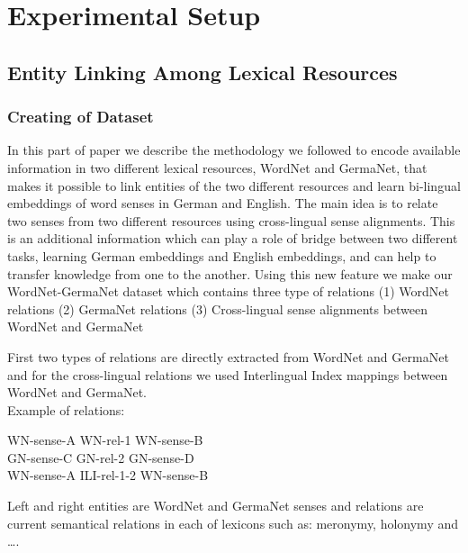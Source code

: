 \chapter{Experimental Setup}
\section{Entity Linking Among Lexical Resources}
\label{sec:exp-ent-link}

\subsection{Creating of Dataset}
\label{ssec:dataset}

In this part of paper we describe the methodology we followed to encode available information 
in two different lexical resources, WordNet and GermaNet, that makes it possible to link entities of the two different
resources and learn bi-lingual 
embeddings of word senses in German and English.  
The main idea is to relate two senses from two different resources using cross-lingual sense alignments.
This is an additional information which can play a role of bridge between two
different tasks, learning German embeddings and English embeddings, and can help to transfer knowledge from one to the another.
Using this new feature we make our WordNet-GermaNet dataset which contains three type of relations 
(1) WordNet relations 
(2) GermaNet relations
(3) Cross-lingual sense alignments between WordNet and GermaNet

First two types of relations are directly extracted from WordNet and GermaNet and for the 
cross-lingual relations we used Interlingual Index mappings between WordNet and GermaNet.
\\
Example of relations:
\begin{center}
WN-sense-A \hspace{0.3in}  WN-rel-1    \hspace{0.3in}  WN-sense-B\\
GN-sense-C \hspace{0.3in}  GN-rel-2    \hspace{0.3in}  GN-sense-D\\
WN-sense-A \hspace{0.3in}  ILI-rel-1-2 \hspace{0.3in}  WN-sense-B\\
\end{center}

Left and right entities are WordNet and GermaNet senses and relations are current semantical relations in each of lexicons such as:
 meronymy, holonymy and \ldots.
 
